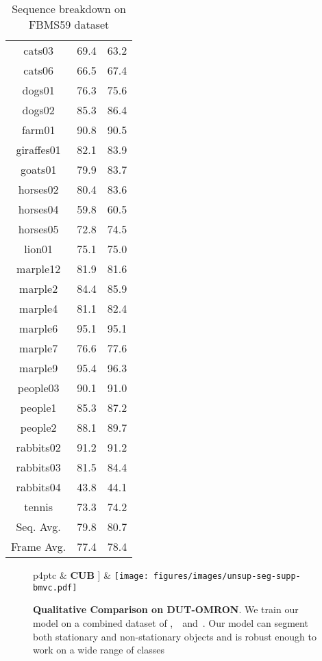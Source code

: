 \begin{table}[t]
{\begin{center}
\begin{tabular}{ccc}
cats03 & 69.4 & 63.2 \\
cats06 & 66.5 & 67.4 \\
dogs01 & 76.3 & 75.6 \\
dogs02 & 85.3 & 86.4 \\
farm01 & 90.8 & 90.5 \\
giraffes01 & 82.1 & 83.9 \\
goats01 & 79.9 & 83.7 \\
horses02 & 80.4 & 83.6 \\
horses04 & 59.8 & 60.5 \\
horses05 & 72.8 & 74.5 \\
lion01 & 75.1 & 75.0 \\
marple12 & 81.9 & 81.6 \\
marple2 & 84.4 & 85.9 \\
marple4 & 81.1 & 82.4 \\
marple6 & 95.1 & 95.1 \\
marple7 & 76.6 & 77.6 \\
marple9 & 95.4 & 96.3 \\
people03 & 90.1 & 91.0 \\
people1 & 85.3 & 87.2 \\
people2 & 88.1 & 89.7 \\
rabbits02 & 91.2 & 91.2 \\
rabbits03 & 81.5 & 84.4 \\
rabbits04 & 43.8 & 44.1 \\
tennis & 73.3 & 74.2 \\
\midrule
Seq. Avg.  & 79.8 & 80.7 \\
Frame Avg. & 77.4 & 78.4 \\
            \bottomrule
    \end{tabular}
    \end{center}
    \caption{Sequence breakdown on FBMS59 dataset}
    \label{tab:supp_seq_fbms}
}
\end{table} \begin{figure}[t]
\centering
\begin{tabular}{p{4pt}c}
    & \textbf{CUB} \-1pt]
     & \texttt{[image: figures/images/unsup-seg-supp-bmvc.pdf]} 
\end{tabular}
\caption{\textbf{Qualitative Comparison on DUT-OMRON}. We train our model on a combined dataset of \DAVIS,~\FBMS~and~\ST. Our model can segment both stationary and non-stationary objects and is robust enough to work on a wide range of classes }
\label{fig:unsup_seg_supp2}
\end{figure}
